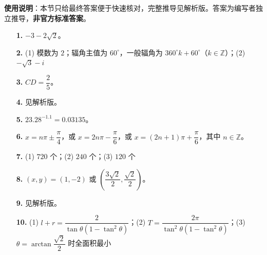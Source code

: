 
\begin{gknotice}
\textbf{使用说明}：本节只给最终答案便于快速核对，完整推导见解析版。答案为编写者独立推导，\textbf{非官方标准答案}。
\end{gknotice}

\begin{itemize}[leftmargin=2.6em]
  \item[\textbf{1.}] $-3-2\sqrt2$。
  \item[\textbf{2.}] (1) 模数为 $2$；辐角主值为 $60^\circ$，一般辐角为 $360^\circ k+60^\circ$（$k\in\mathbb Z$）；(2) $-\sqrt3-i$
  \item[\textbf{3.}] $CD=\dfrac25$。
  \item[\textbf{4.}] 见解析版。
  \item[\textbf{5.}] $23.28^{-1.1}=0.03135$。
\end{itemize}

\begin{itemize}[leftmargin=2.6em]
  \item[\textbf{6.}] $x=n\pi\pm\dfrac\pi4$，或 $x=2n\pi-\dfrac\pi6$，或 $x=(2n+1)\pi+\dfrac\pi6$，其中 $n\in\mathbb Z$。
  \item[\textbf{7.}] (1) $720$ 个；(2) $240$ 个；(3) $120$ 个
  \item[\textbf{8.}] $(x,y)=(1,-2)$ 或 $\left(\dfrac{3\sqrt2}{2},\dfrac{\sqrt2}{2}\right)$。
  \item[\textbf{9.}] 见解析版。
  \item[\textbf{10.}] (1) $l+r=\dfrac{2}{\tan\theta(1-\tan^2\theta)}$；(2) $T=\dfrac{2\pi}{\tan^2\theta(1-\tan^2\theta)}$；(3) $\theta=\arctan\dfrac{\sqrt2}{2}$ 时全面积最小
\end{itemize}
